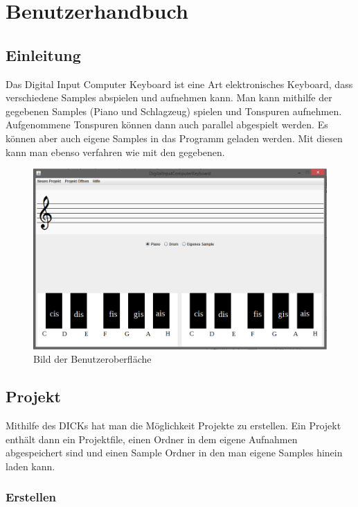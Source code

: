 \section{Benutzerhandbuch}
\subsection{Einleitung}

Das Digital Input Computer Keyboard ist eine Art elektronisches Keyboard, dass verschiedene Samples abspielen und aufnehmen kann. Man kann mithilfe der gegebenen Samples (Piano und Schlagzeug) spielen und Tonspuren aufnehmen. Aufgenommene Tonspuren können dann auch parallel abgespielt werden. Es können aber auch eigene Samples in das Programm geladen werden. Mit diesen kann man ebenso verfahren wie mit den gegebenen.

\begin{figure}[hbtp]
\centering
\includegraphics[scale=0.6]{Bilder/Projektbild1.PNG} 
\caption{Bild der Benutzeroberfläche}
\end{figure}


\subsection{Projekt}

Mithilfe des DICKs hat man die Möglichkeit Projekte zu erstellen. Ein Projekt enthält dann ein Projektfile, einen Ordner in dem eigene Aufnahmen abgespeichert sind und einen Sample Ordner in den man eigene Samples hinein laden kann.

\newpage


\subsubsection{Erstellen}

